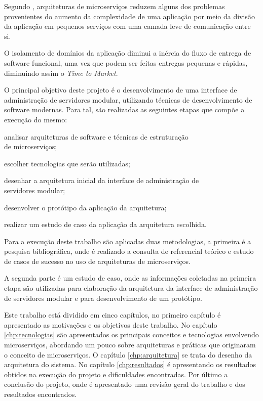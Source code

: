 Segundo , arquiteturas de microserviços reduzem
alguns dos problemas provenientes do aumento da complexidade de uma aplicação
por meio da divisão da aplicação em pequenos serviços com uma camada leve
de comunicação entre si.

O isolamento de domínios da aplicação diminui a inércia do fluxo de entrega
de software funcional, uma vez que podem ser feitas entregas pequenas e
rápidas, diminuindo assim o \emph{Time to Market}.

O principal objetivo deste projeto é o desenvolvimento de uma interface
de administração de servidores modular, utilizando técnicas de desenvolvimento
de software modernas. Para tal, são realizadas as seguintes etapas que compõe
a execução do mesmo:

\begin{alineas}
  \item analisar arquiteturas de software e técnicas de estruturação \\
    de microserviços;
  \item escolher tecnologias que serão utilizadas;
  \item desenhar a arquitetura inicial da interface de administração de \\
    servidores modular;
  \item desenvolver o protótipo da aplicação da arquitetura;
  \item realizar um estudo de caso da aplicação da arquitetura escolhida.
\end{alineas}

Para a execução deste trabalho são aplicadas duas metodologias, a primeira
é a pesquisa bibliográfica, onde é realizado a consulta de referencial
teórico e estudo de casos de sucesso no uso de arquiteturas de microserviços.

A segunda parte é um estudo de caso, onde as informações coletadas
na primeira etapa são utilizadas para elaboração da arquitetura da interface
de administração de servidores modular e para desenvolvimento de um protótipo.

Este trabalho está dividido em cinco capítulos, no primeiro capítulo é
apresentado as motivações e os objetivos deste trabalho. No capítulo
\ref{chp:tecnologias} são apresentados os principais conceitos e tecnologias
envolvendo microserviços, abordando um pouco sobre arquiteturas
e práticas que originaram o conceito de microserviços. O capítulo
\ref{chp:arquitetura} se trata do desenho da arquitetura do sistema. No
capítulo \ref{chp:resultados} é apresentando os resultados obtidos na execução
do projeto e dificuldades encontradas. Por último a conclusão do projeto,
onde é apresentado uma revisão geral do trabalho e dos resultados encontrados.
